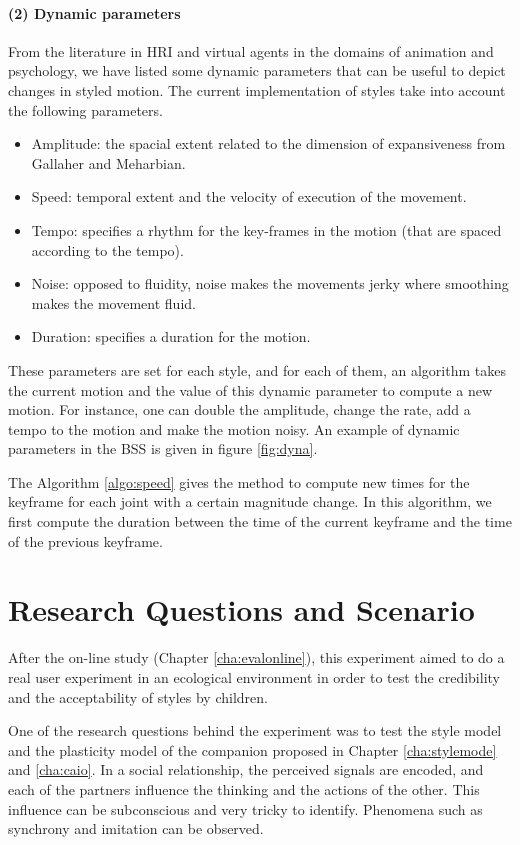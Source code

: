 \documentclass[smallextended]{svjour3}
\begin{document}
\paragraph{(2) Dynamic parameters}
From the literature in HRI and virtual agents in the domains of animation and psychology, we have listed some dynamic parameters that can be useful to depict changes in styled motion.
The current implementation of styles take into account the following parameters. 

\begin{itemize}[noitemsep,nolistsep]
	\item Amplitude: the spacial extent related to the dimension of expansiveness from Gallaher and Meharbian.
	\item Speed: temporal extent and the velocity of execution of the movement.
	\item Tempo: specifies a rhythm for the key-frames in the motion (that are spaced according to the tempo).
	\item Noise: opposed to fluidity, noise makes the movements jerky where smoothing makes the movement fluid.
	\item Duration: specifies a duration for the motion.
\end{itemize}
These parameters are set for each style, and for each of them, an algorithm takes the current motion and the value of this dynamic parameter to compute a new motion.
For instance, one can double the amplitude, change the rate, add a tempo to the motion and make the motion noisy.
An example of dynamic parameters in the BSS is given in figure \ref{fig:dyna}.


The Algorithm \ref{algo:speed} gives the method to compute new times for the keyframe for each joint with a certain magnitude change.
In this algorithm, we first compute the duration between the time of the current keyframe and the time of the previous keyframe. 


\section{Research Questions and Scenario}\label{sec:research-questions-and-scenario}
After the on-line study (Chapter \ref{cha:evalonline}), this experiment aimed to do a real user experiment in an ecological environment in order to test the credibility and the acceptability of styles by children. 

One of the research questions behind the experiment was to test the style model and the plasticity model of the companion proposed in Chapter \ref{cha:stylemode} and \ref{cha:caio}. 
In a social relationship, the perceived signals are encoded, and each of the partners influence the thinking and the actions of the other.
This influence can be subconscious and very tricky to identify. 
Phenomena such as synchrony and imitation can be observed. 
\end{document}
